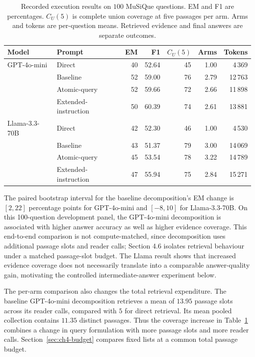 \begin{table}[htbp]
\centering
\caption{Recorded execution results on $100$ MuSiQue questions. EM and F1
are percentages. $C_U(5)$ is complete union coverage at five passages per arm.
Arms and tokens are per-question means. Retrieved evidence and final answers
are separate outcomes.}
\label{tab:ch4-system}
\small
\begin{tabular}{llrrrrr}
\hline
Model & Prompt & EM & F1 & $C_U(5)$ & Arms & Tokens \\
\hline
GPT-4o-mini & Direct & 40 & 52.64 & 45 & 1.00 & 4\,369 \\
 & Baseline & 52 & 59.00 & 76 & 2.79 & 12\,763 \\
 & Atomic-query & 52 & 59.66 & 72 & 2.66 & 11\,898 \\
 & Extended-instruction & 50 & 60.39 & 74 & 2.61 & 13\,881 \\
\hline
Llama-3.3-70B & Direct & 42 & 52.30 & 46 & 1.00 & 4\,530 \\
 & Baseline & 43 & 51.37 & 79 & 3.00 & 14\,069 \\
 & Atomic-query & 45 & 53.54 & 78 & 3.22 & 14\,789 \\
 & Extended-instruction & 47 & 55.94 & 75 & 2.84 & 15\,271 \\
\hline
\end{tabular}
\end{table}

The paired bootstrap interval for the baseline decomposition's EM change is
$[2,22]$ percentage points for GPT-4o-mini and $[-8,10]$ for Llama-3.3-70B.
On this 100-question development panel, the GPT-4o-mini decomposition is associated 
with higher answer accuracy as well as higher evidence coverage. This end-to-end comparison 
is not compute-matched, since decomposition uses additional passage slots and reader calls; 
Section 4.6 isolates retrieval behaviour under a matched passage-slot budget.
The Llama result shows that increased evidence coverage does not necessarily translate into a 
comparable answer-quality gain, motivating the controlled intermediate-answer experiment below.

The per-arm comparison also changes the total retrieval expenditure. The
baseline GPT-4o-mini decomposition retrieves a mean of $13.95$ passage slots
across its reader calls, compared with $5$ for direct retrieval. Its mean pooled
collection contains $11.35$ distinct passages. Thus the coverage increase in
Table~\ref{tab:ch4-system} combines a change in query formulation with more
passage slots and more reader calls. Section~\ref{sec:ch4-budget} compares
fixed lists at a common total passage budget.

